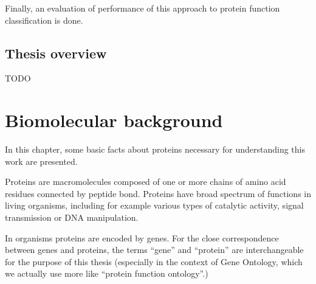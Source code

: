 \documentclass[11pt,twoside,a4paper]{book}
\begin{document}
Finally, an evaluation of performance of this approach to protein function classification is done. 


\section{Thesis overview}
TODO



\chapter{Biomolecular background}
In this chapter, some basic facts about proteins
necessary for understanding this work are presented.

Proteins are macromolecules composed of one or more chains of amino acid residues
connected by peptide bond.
Proteins have broad spectrum of functions in living organisms, including for example 
various types of catalytic activity, signal transmission or DNA manipulation.

In organisms proteins are encoded by genes. 
For the close correspondence between genes and proteins,
the terms ``gene'' and ``protein'' are interchangeable for the purpose of this thesis
(especially in the context of Gene Ontology, which we actually use more like ``protein function ontology''.)

\end{document}
